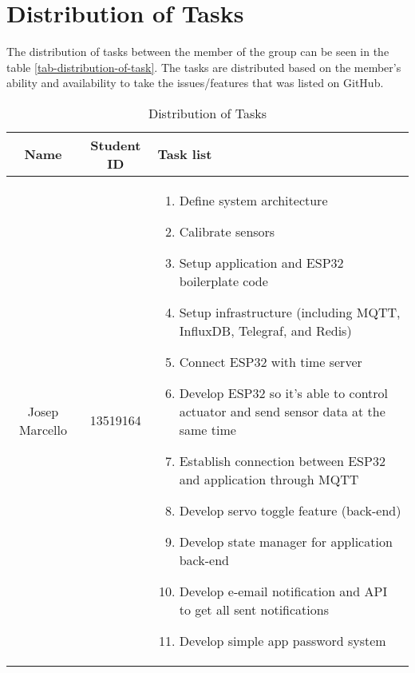 \section*{Distribution of Tasks}

The distribution of tasks between the member of the group can be
seen in the table \ref{tab-distribution-of-task}.
The tasks are distributed based on the member's ability and
availability to take the issues/features that was listed on GitHub.

\begin{table*}[htbp]
	\caption{Distribution of Tasks}
	\begin{center}
		\begin{tabular}{|c|c|p{10cm}|}
			\hline
			\textbf{Name}    & \textbf{Student ID} & \textbf{Task list}                                                                        \\
			\hline
			Josep Marcello   & 13519164            & \begin{enumerate}[leftmargin=*]
				                                         \item Define system architecture
				                                         \item Calibrate sensors
				                                         \item Setup application and ESP32 boilerplate code
				                                         \item Setup infrastructure (including MQTT, InfluxDB, Telegraf, and Redis)
				                                         \item Connect ESP32 with time server
				                                         \item Develop ESP32 so it's able to control actuator and send sensor data at the same time
				                                         \item Establish connection between ESP32 and application through MQTT
				                                         \item Develop servo toggle feature (back-end)
				                                         \item Develop state manager for application back-end
				                                         \item Develop e-email notification and API to get all sent notifications
				                                         \item Develop simple app password system

\end{enumerate}
\end{tabular}
\end{center}
\end{table*}
